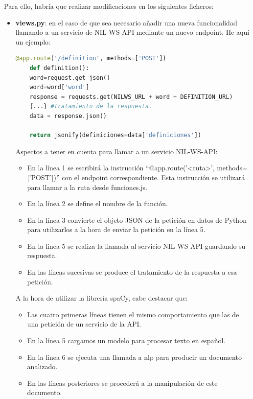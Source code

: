 Para ello, habría que realizar modificaciones en los siguientes ficheros:
\begin{itemize}
	\item \textbf{views.py}: en el caso de que sea necesario añadir una nueva funcionalidad llamando a un servicio de NIL-WS-API mediante un nuevo endpoint. He aquí un ejemplo:
	
			\begin{lstlisting}[language=python,firstnumber=1]
	@app.route('/definition', methods=['POST'])
	def definition():
	word=request.get_json()
	word=word['word']
	response = requests.get(NILWS_URL + word + DEFINITION_URL)
	{...} #Tratamiento de la respuesta.
	data = response.json() 	
			
	return jsonify(definiciones=data['definiciones'])
	\end{lstlisting}

Aspectos a tener en cuenta para llamar a un servicio NIL-WS-API:
\begin{itemize}
	\item En la línea 1 se escribirá la instrucción ``$@$app.route('<ruta>', methods=['POST'])'' con el endpoint correspondiente. Esta instrucción se utilizará para llamar a la ruta desde funciones.js.
	\item En la línea 2 se define el nombre de la función.
	\item En la línea 3 convierte el objeto JSON de la petición en datos de Python para utilizarlos a la hora de enviar la petición en la línea 5.
	\item En la línea 5 se realiza la llamada al servicio NIL-WS-API guardando su respuesta.
	\item En las líneas sucesivas se produce el tratamiento de la respuesta a esa petición.
\end{itemize}

A la hora de utilizar la librería spaCy, cabe destacar que:

\begin{itemize}
	\item Las cuatro primeras líneas tienen el mismo comportamiento que las de una petición de un servicio de la API.
	\item En la línea 5 cargamos un modelo para procesar texto en español.
	\item En la línea 6 se ejecuta una llamada a nlp para producir un documento analizado.
	\item En las líneas posteriores se procederá a la manipulación de este documento.
\end{itemize}


\end{itemize}
